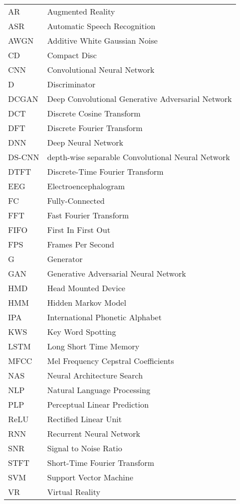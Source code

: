 
\chapter*{}

\begin{tabular}{ l l }
AR & Augmented Reality\\
ASR & Automatic Speech Recognition\\
AWGN & Additive White Gaussian Noise\\
CD & Compact Disc\\
CNN & Convolutional Neural Network\\
D & Discriminator\\
DCGAN & Deep Convolutional Generative Adversarial Network\\
DCT & Discrete Cosine Transform\\
DFT & Discrete Fourier Transform\\
DNN & Deep Neural Network\\
DS-CNN & depth-wise separable Convolutional Neural Network\\
DTFT & Discrete-Time Fourier Transform\\
EEG & Electroencephalogram\\
FC & Fully-Connected\\
FFT & Fast Fourier Transform\\
FIFO & First In First Out\\
FPS & Frames Per Second\\
G & Generator\\
GAN & Generative Adversarial Neural Network\\
HMD & Head Mounted Device\\
HMM & Hidden Markov Model\\
IPA & International Phonetic Alphabet\\
KWS & Key Word Spotting\\
LSTM & Long Short Time Memory\\
MFCC & Mel Frequency Cepstral Coefficients\\
NAS & Neural Architecture Search\\
NLP & Natural Language Processing\\
PLP & Perceptual Linear Prediction\\
ReLU & Rectified Linear Unit\\
RNN & Recurrent Neural Network\\
SNR & Signal to Noise Ratio\\
STFT & Short-Time Fourier Transform\\
SVM & Support Vector Machine\\
VR & Virtual Reality\\
\end{tabular}